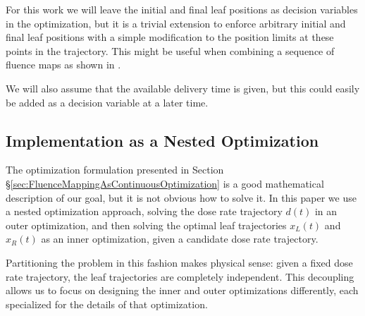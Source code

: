 For this work we will leave the initial and final leaf positions as decision variables in the optimization,
but it is a trivial extension to enforce arbitrary initial and final leaf positions
with a simple modification to the position limits at these points in the trajectory.
This might be useful when combining a sequence of fluence maps as shown in \cite{balvertcraft}.

We will also assume that the available delivery time is given,
but this could easily be added as a decision variable at a later time.



\subsection{Implementation as a Nested Optimization}

The optimization formulation presented in Section \S \ref{sec:FluenceMappingAsContinuousOptimization}
is a good mathematical description of our goal, but it is not obvious how to solve it.
In this paper we use a nested optimization approach,
solving the dose rate trajectory $d(t)$ in an outer optimization,
and then solving the optimal leaf trajectories $x_L(t)$ and $x_R(t)$ as an inner optimization,
given a candidate dose rate trajectory.

Partitioning the problem in this fashion makes physical sense: given a fixed dose rate trajectory,
the leaf trajectories are completely independent.
This decoupling allows us to focus on designing the inner and outer optimizations differently,
each specialized for the details of that optimization.





